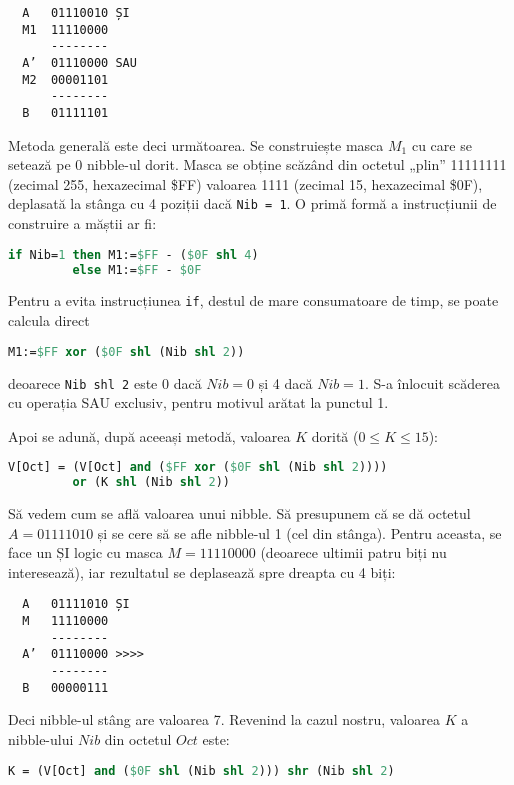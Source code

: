 \begin{verbatim}
  A   01110010 ȘI
  M1  11110000
      --------
  A’  01110000 SAU
  M2  00001101
      --------
  B   01111101
\end{verbatim}

Metoda generală este deci următoarea. Se construiește masca $M_1$ cu care se
setează pe 0 nibble-ul dorit. Masca se obține scăzând din octetul „plin”
11111111 (zecimal 255, hexazecimal \$FF) valoarea 1111 (zecimal 15,
hexazecimal \$0F), deplasată la stânga cu 4 poziții dacă {\tt Nib = 1}. O
primă formă a instrucțiunii de construire a măștii ar fi:

\begin{lstlisting}[language=Pascal]
if Nib=1 then M1:=$FF - ($0F shl 4)
         else M1:=$FF - $0F
\end{lstlisting}

Pentru a evita instrucțiunea {\tt if}, destul de mare consumatoare de timp, se
poate calcula direct

\begin{lstlisting}[language=Pascal]
M1:=$FF xor ($0F shl (Nib shl 2))
\end{lstlisting}

deoarece {\tt Nib shl 2} este 0 dacă $Nib = 0$ și 4 dacă $Nib = 1$. S-a
înlocuit scăderea cu operația SAU exclusiv, pentru motivul arătat la punctul
1.

Apoi se adună, după aceeași metodă, valoarea $K$ dorită ($0 \leq K \leq 15$):

\begin{lstlisting}[language=Pascal]
V[Oct] = (V[Oct] and ($FF xor ($0F shl (Nib shl 2))))
         or (K shl (Nib shl 2))
\end{lstlisting}

Să vedem cum se află valoarea unui nibble. Să presupunem că se dă octetul $A =
01111010$ și se cere să se afle nibble-ul 1 (cel din stânga). Pentru aceasta,
se face un ȘI logic cu masca $M = 11110000$ (deoarece ultimii patru biți nu
interesează), iar rezultatul se deplasează spre dreapta cu 4 biți:

\begin{verbatim}
  A   01111010 ȘI
  M   11110000
      --------
  A’  01110000 >>>>
      --------
  B   00000111
\end{verbatim}

Deci nibble-ul stâng are valoarea 7. Revenind la cazul nostru, valoarea $K$ a
nibble-ului $Nib$ din octetul $Oct$ este:

\begin{lstlisting}[language=Pascal]
K = (V[Oct] and ($0F shl (Nib shl 2))) shr (Nib shl 2)
\end{lstlisting}


